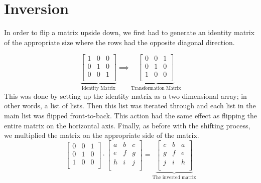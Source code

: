 \section{Inversion}

In order to flip a matrix upside down, we first had to generate an identity
matrix of the appropriate size where the rows had the opposite diagonal
direction.

\[
  \underbrace{
    \begin{bmatrix}
      1&0&0\\
      0&1&0\\
      0&0&1\\
    \end{bmatrix}
  }_{\text{Identity Matrix}}
  \implies
  \underbrace{
    \begin{bmatrix}
      0&0&1\\
      0&1&0\\
      1&0&0\\
    \end{bmatrix}
  }_{\text{Transformation
  Matrix}}
\]
This was done by setting up the identity matrix as a two dimensional array; in
other words, a list of lists. Then this list was iterated through and each list
in the main list was flipped front-to-back. This action had the same effect as
flipping the entire matrix on the horizontal axis. Finally, as before with the
shifting process, we multiplied the matrix on the appropriate side of the
matrix.
\[ 
  \begin{bmatrix}
    0&0&1\\
    0&1&0\\
    1&0&0\\
  \end{bmatrix}
  \cdot
  \begin{bmatrix}
    a&b&c\\
    e&f&g\\
    h&i&j\\
  \end{bmatrix}
  =
  \underbrace{
  \begin{bmatrix}
    c&b&a\\
    g&f&e\\
    j&i&h\\
  \end{bmatrix}
  }_{\text{The
  inverted  
  matrix}}
\]

